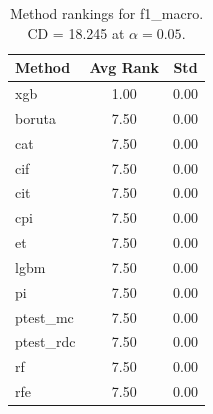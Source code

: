 \begin{table}[h]
\centering
\caption{Method rankings for f1_macro. CD = 18.245 at $\alpha=0.05$.}
\label{tab:ranks_f1_macro}
\begin{tabular}{lcc}
\toprule
Method & Avg Rank & Std \\
\midrule
xgb & 1.00 & 0.00 \\
boruta & 7.50 & 0.00 \\
cat & 7.50 & 0.00 \\
cif & 7.50 & 0.00 \\
cit & 7.50 & 0.00 \\
cpi & 7.50 & 0.00 \\
et & 7.50 & 0.00 \\
lgbm & 7.50 & 0.00 \\
pi & 7.50 & 0.00 \\
ptest_mc & 7.50 & 0.00 \\
ptest_rdc & 7.50 & 0.00 \\
rf & 7.50 & 0.00 \\
rfe & 7.50 & 0.00 \\
\bottomrule
\end{tabular}
\end{table}